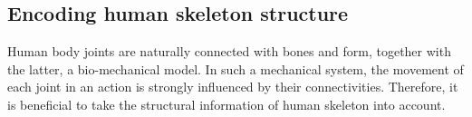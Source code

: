 \documentclass[10pt,twocolumn,letterpaper]{article}
\begin{document}

\subsection{Encoding human skeleton structure}
Human body joints are naturally connected with bones and form, together with the latter, a bio-mechanical model. In such a mechanical system, the movement of each joint in an action is strongly influenced by their connectivities. Therefore, it is beneficial to take the structural information of human skeleton into account.
\end{document}
